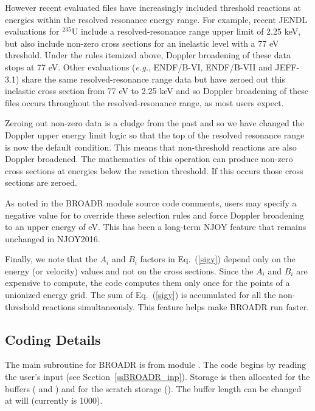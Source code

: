 However recent evaluated files have increasingly included threshold
reactions at energies within the resolved resonance energy
range.  For example, recent JENDL evaluations for $^{235}$U include a
resolved-resonance range upper limit of 2.25 keV, but also
include non-zero cross sections for an inelastic level with a 77 eV
threshold.  Under the rules itemized above, Doppler broadening of
these data stops at 77 eV.  Other evaluations ({\it e.g.}, ENDF/B-VI,
ENDF/B-VII and JEFF-3.1) share the same resolved-resonance range data but
have zeroed out this inelastic cross section from 77 eV to 2.25 keV
and so Doppler broadening of these files occurs throughout the
resolved-resonance range, as most users expect.

Zeroing out non-zero data is a cludge from the past and so we have
changed the Doppler upper energy limit logic so that the top of the
resolved resonance range is now the default condition.  This means
that non-threshold reactions are also Doppler broadened.  The
mathematics of this operation can produce non-zero cross sections
at energies below the reaction threshold.  If this occurs those
cross sections are zeroed.

As noted in the BROADR module source code comments, users
may specify a negative value for  to override these
selection rules and force Doppler broadening to an upper energy
of  eV.  This has been a long-term NJOY feature
that remains unchanged in NJOY2016.

Finally, we note that the $A_i$ and $B_i$
factors in Eq.~(\ref{sigy}) depend only on the energy (or
velocity) values and not on the cross sections.  Since the $A_i$
and $B_i$ are expensive to compute, the code computes them only
once for the points of a unionized energy grid.  The sum of
Eq.~(\ref{sigy}) is accumulated for all the non-threshold
reactions simultaneously.  This feature helps make BROADR run
faster.

\subsection{Coding Details}
\label{ssBROADR_details}

The main subroutine for BROADR is
 from
module .  The
code begins by reading the user's input (see Section~\ref{ssBROADR_inp}).
Storage is then allocated for the  buffers
( and ) and for the scratch storage
().  The buffer length  can be changed at
will (currently  is 1000).

